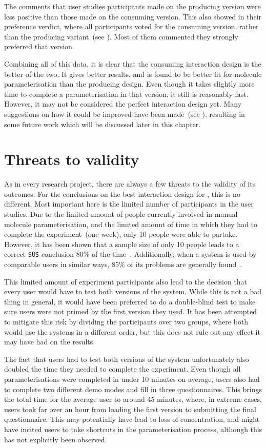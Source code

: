 The comments that user studies participants made on the producing version were less positive than those made on the consuming version. This also showed in their preference verdict, where all participants voted for the consuming version, rather than the producing variant~(see ). Most of them commented they strongly preferred that version.

Combining all of this data, it is clear that the consuming interaction design is the better of the two. It gives better results, and is found to be better fit for molecule parameterisation than the producing design. Even though it takes slightly more time to complete a parameterisation in that version, it still is reasonably fast. However, it may not be considered the perfect interaction design yet. Many suggestions on how it could be improved have been made~(see ), resulting in some future work which will be discussed later in this chapter.


\section{Threats to validity}
As in every research project, there are always a few threats to the validity of its outcomes. For the conclusions on the best interaction design for \oframp, this is no different. Most important here is the limited number of participants in the user studies. Due to the limited amount of people currently involved in manual molecule parameterisation, and the limited amount of time in which they had to complete the experiment~(one week), only 10 people were able to partake. However, it has been shown that a sample size of only 10 people leads to a correct \verb|SUS| conclusion $80\%$ of the time~\cite{tullis2004comparison}. Additionally, when a system is used by comparable users in similar ways, $85\%$ of its problems are generally found~\cite{nielsen2000you}.

This limited amount of experiment participants also lead to the decision that every user would have to test both versions of the system. While this is not a bad thing in general, it would have been preferred to do a double-blind test to make sure users were not primed by the first version they used. It has been attempted to mitigate this risk by dividing the participants over two groups, where both would use the systems in a different order, but this does not rule out any effect it may have had on the results.

The fact that users had to test both versions of the system unfortunately also doubled the time they needed to complete the experiment. Even though all parameterisations were completed in under 10 minutes on average, users also had to complete two different demo modes and fill in three questionnaires. This brings the total time for the average user to around 45 minutes, where, in extreme cases, users took far over an hour from loading the first version to submitting the final questionnaire. This may potentially have lead to loss of concentration, and might have incited users to take shortcuts in the parameterisation process, although this has not explicitly been observed.

